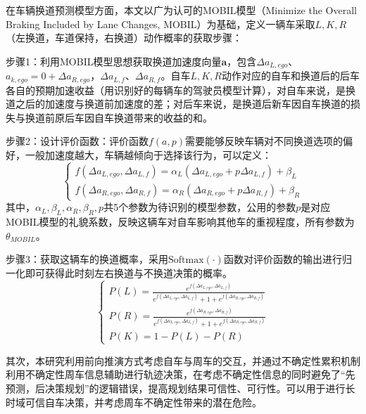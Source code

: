     在车辆换道预测模型方面，本文以广为认可的MOBIL模型（Minimize the Overall Braking Included by Lane Changes, MOBIL）\cite{MOBIL_1999}为基础，定义一辆车采取$L,K,R$（左换道，车道保持，右换道）动作概率的获取步骤：

    步骤1：利用MOBIL模型思想获取换道加速度向量$\boldsymbol{a}$，包含$\Delta a_{L,ego}$、$a_{k,ego}=0+\Delta a_{R,ego}$，$\Delta a_{L,f}$、$\Delta a_{R,f}$。自车$L,K,R$动作对应的自车和换道后的后车各自的预期加速收益（用识别好的每辆车的驾驶员模型计算），对自车来说，是换道之后的加速度与换道前加速度的差；对后车来说，是换道后新车因自车换道的损失与换道前原后车因自车换道带来的收益的和。

    步骤2：设计评价函数：评价函数$f(a,p)$需要能够反映车辆对不同换道选项的偏好，一般加速度越大，车辆越倾向于选择该行为，可以定义：
    \begin{equation}
    \begin{cases}
    f(\Delta a_{L,ego},\Delta a_{L,f}) = \alpha_L(\Delta a_{L,ego} + p\Delta a_{L,f}) + \beta_L \\
    f(\Delta a_{R,ego},\Delta a_{R,f}) = \alpha_R(\Delta a_{R,ego} + p\Delta a_{R,f}) + \beta_R
    \end{cases}
    \end{equation}
    \noindent 其中，$\alpha_L,\beta_L,\alpha_R,\beta_R,p$共5个参数为待识别的模型参数，公用的参数$p$是对应MOBIL模型的礼貌系数，反映这辆车对自车影响其他车的重视程度，所有参数为$\theta_{MOBIL}$。

    步骤3：获取这辆车的换道概率，采用$\text{Softmax}(\cdot)$函数对评价函数的输出进行归一化即可获得此时刻左右换道与不换道决策的概率。
    \begin{equation}
    \begin{cases}
    P(L) = \frac{e^{f(\Delta a_{L,ego},\Delta a_{L,f})}}{e^{f(\Delta a_{L,ego},\Delta a_{L,f})} + 1 + e^{f(\Delta a_{R,ego},\Delta a_{R,f})}} \\
    P(R) = \frac{e^{f(\Delta a_{R,ego},\Delta a_{R,f})}}{e^{f(\Delta a_{L,ego},\Delta a_{L,f})} + 1 + e^{f(\Delta a_{R,ego},\Delta a_{R,f})}} \\
    P(K) = 1 - P(L) - P(R)
    \end{cases}
    \end{equation}

    其次，本研究利用前向推演方式考虑自车与周车的交互，并通过不确定性累积机制利用不确定性周车信息辅助进行轨迹决策，在考虑不确定性信息的同时避免了“先预测，后决策规划”的逻辑错误，提高规划结果可信性、可行性。可以用于进行长时域可信自车决策，并考虑周车不确定性带来的潜在危险。

